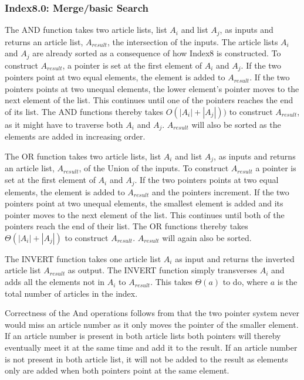 \subsubsection{Index8.0: Merge/basic Search}
The AND function takes two article lists, list $A_i$ and list $A_j$, as inputs and returns an article list, $A_{result}$, the intersection of the inputs. The article lists $A_i$ and $A_j$ are already sorted as a consequence of how Index8 is constructed. To construct $A_{result}$, a pointer is set at the first element of $A_i$ and $A_j$. If the two pointers point at two equal elements, the element is added to $A_{result}$. If the two pointers points at two unequal elements, the lower element's pointer moves to the next element of the list. This continues until one of the pointers reaches the end of its list. The AND functions thereby takes $O(|A_i| + |A_j|))$ to construct $A_{result}$, as it might have to traverse both $A_i$ and $A_j$. $A_{result}$ will also be sorted as the elements are added in increasing order.

The OR function takes two article lists, list $A_i$ and list $A_j$, as inputs and returns an article list, $A_{result}$, of the Union of the inputs. To construct $A_{result}$ a pointer is set at the first element of $A_i$ and $A_j$. If the two pointers points at two equal elements, the element is added to $A_{result}$ and the pointers increment. If the two pointers point at two unequal elements, the smallest element is added and its pointer moves to the next element of the list. This continues until both of the pointers reach the end of their list. The OR functions thereby takes $\Theta(|A_i| + |A_j|)$ to construct $A_{result}$. $A_{result}$ will again also be sorted.

The INVERT function takes one article list $A_i$ as input and returns the inverted article list $A_{result}$ as output. The INVERT function simply transverses $A_i$ and adds all the elements not in $A_i$ to $A_{result}$.
This takes $\Theta(a)$ to do, where $a$ is the total number of articles in the index. 

Correctness of the And operations follows from that the two pointer system never would miss an article number as it only moves the pointer of the smaller element. If an article number is present in both article lists both pointers will thereby eventually meet it at the same time and add it to the result. If an article number is not present in both article list, it will not be added to the result as elements only are added when both pointers point at the same element.

